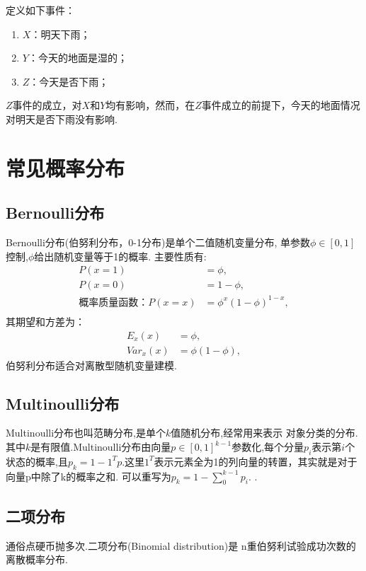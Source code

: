 \begin{example}
  定义如下事件：
  \begin{enumerate}
  \item \(X\)：明天下雨；
  \item \(Y\)：今天的地面是湿的；
  \item \(Z\)：今天是否下雨；    
  \end{enumerate}
\(Z\)事件的成立，对\(X\)和\(Y\)均有影响，然而，在\(Z\)事件成立的前提下，今天的地面情况对明天是否下雨没有影响.
\end{example}

\section{常见概率分布}
\label{ux5e38ux89c1ux6982ux7387ux5206ux5e03}
\subsection{ Bernoulli分布}
\label{bernoulliux5206ux5e03}
Bernoulli分布(伯努利分布，0-1分布)是单个二值随机变量分布,
单参数\(\phi∈[0,1]\)控制,\(\phi\)给出随机变量等于1的概率.
主要性质有: 
\begin{align*}
P(x=1) &= \phi ,\\
P(x=0) &= 1-\phi  ,\\
概率质量函数：P(x=x) &= \phi^x(1-\phi)^{1-x} ,\\
\end{align*}
 其期望和方差为： 
\begin{align*}
E_x(x) &= \phi, \\
Var_x(x) &= \phi{(1-\phi)},
\end{align*}
伯努利分布适合对离散型随机变量建模.

\subsection{Multinoulli分布}
\label{sec:5.2}
Multinoulli分布也叫范畴分布,是单个$k$值随机分布,经常用来表示 {对象分类的分布}.
其中\(k\)是有限值.Multinoulli分布由向量\(p\in[0,1]^{k-1}\)参数化,每个分量\(p_i\)表示第\(i\)个状态的概率,且\(p_k=1-1^Tp\).这里\(1^T\)表示元素全为1的列向量的转置，其实就是对于向量p中除了k的概率之和.
可以重写为\(p_k=1-\sum_{0}^{k-1}p_i\).
.

\subsection{二项分布}
通俗点硬币抛多次.二项分布(Binomial
distribution)是 {n重伯努利试验}成功次数的离散概率分布.
